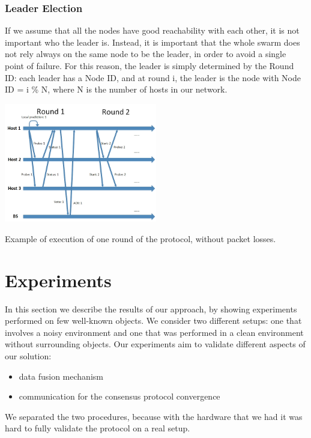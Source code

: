 \documentclass[10pt,conference,compsocconf]{IEEEtran}
\begin{document}
\subsubsection*{Leader Election}
If we assume that all the nodes have good reachability with each other, it is not important who the leader is. Instead, it is important that the whole swarm does not rely always on the same node to be the leader, in order to avoid a single point of failure. For this reason, the leader is simply determined by the Round ID: each leader has a Node ID, and at round i, the leader is the node with Node ID = i \% N, where N is the number of hosts in our network.
\begin{center}
	\captionsetup{type=figure}
	\includegraphics[width=0.5\textwidth]{img/temporal_sketch.jpg}
	\caption {Example of execution of one round of the protocol, without packet losses.}
	\label{fig:person_FP_FN}
\end{center}
\section{Experiments}
In this section we describe the results of our approach, by showing experiments performed on few well-known objects. We consider two different setups: one that involves a noisy environment and one that was performed in a clean environment without surrounding objects.
Our experiments aim to validate different aspects of our solution:
\begin{itemize}
\item data fusion mechanism
\item communication for the consensus protocol convergence
\end{itemize}
We separated the two procedures, because with the hardware that we had it was hard to fully validate the protocol on a real setup.
\end{document}
